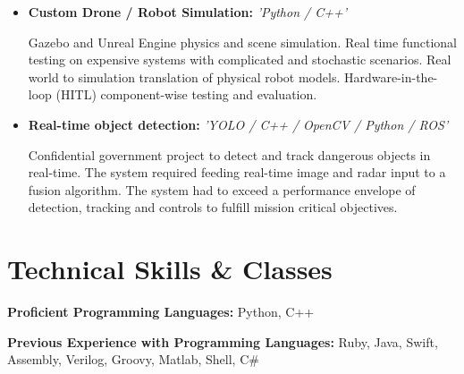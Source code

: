 \documentclass[11pt,a4paper,sans]{moderncv}        %
\begin{document}
\begin{itemize}

\item{\textbf{Custom Drone / Robot Simulation:} \textit{'Python / C++'}

\vspace{5pt}

\small{Gazebo and Unreal Engine physics and scene simulation. Real time functional testing on expensive systems with complicated and stochastic scenarios. Real world to simulation translation of physical robot models. Hardware-in-the-loop (HITL) component-wise testing and evaluation.}}

\vspace{6pt}

\item{\textbf{Real-time object detection:} \textit{'YOLO / C++ / OpenCV / Python / ROS'}

\vspace{5pt}

\small{Confidential government project to detect and track dangerous objects in real-time. The system required feeding real-time image and radar input  to a fusion algorithm. The system had to exceed a performance envelope of detection, tracking and controls to fulfill mission critical objectives. }}

\vspace{6pt}

\end{itemize}

\section{Technical Skills \& Classes}

\vspace{2pt}

\textbf{Proficient Programming Languages:} Python, C++

\vspace{3pt}

\textbf{Previous Experience with Programming Languages:} Ruby, Java, Swift, Assembly, Verilog, Groovy, Matlab, Shell, C\#

\vspace{6pt}
\end{document}
